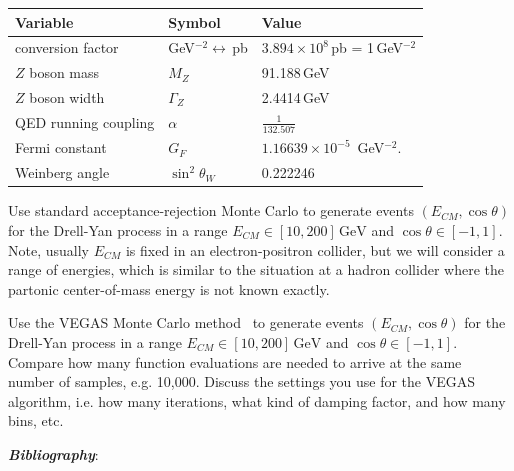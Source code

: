 \begin{center}
  \begin{tabular}{lll}
    Variable             & Symbol                        & Value                                  \\ \hline
    conversion factor    & GeV$^{-2}\leftrightarrow$\,pb & $3.894\times 10^8$\,pb = 1\,GeV$^{-2}$ \\
    $Z$ boson mass       & $M_Z$                         & 91.188\,GeV                            \\
    $Z$ boson width      & $\Gamma_Z$                    & 2.4414\,GeV                            \\
    QED running coupling & $\alpha$                      & $\frac{1}{132.507}$                    \\
    Fermi constant       & $G_F$                         & $1.16639\times 10^{-5}$~GeV$^{-2}$.    \\
    Weinberg angle       & $\sin^2 \theta_W$             & 0.222246                               \\
  \end{tabular}
\end{center}

\begin{problem}
Use standard acceptance-rejection Monte Carlo to generate events $(E_{CM}, \cos\theta)$ for the Drell-Yan process in a range $E_{CM} \in [10, 200]\,\text{GeV}$ and $\cos\theta \in [-1, 1]$.
Note, usually $E_{CM}$ is fixed in an electron-positron collider, but we will consider a range of energies, which is similar to the situation at a hadron collider where the partonic center-of-mass energy is not known exactly.
\end{problem}

\begin{problem}
Use the VEGAS Monte Carlo method~\cite{Lepage:1977sw,Lepage:2020tgj} to generate events $(E_{CM}, \cos\theta)$ for the Drell-Yan process in a range $E_{CM} \in [10, 200]\,\text{GeV}$ and $\cos\theta \in [-1, 1]$.
Compare how many function evaluations are needed to arrive at the same number of samples, e.g. 10,000.
Discuss the settings you use for the VEGAS algorithm, i.e. how many iterations, what kind of damping factor, and how many bins, etc.
\end{problem}

\newpage

\noindent\textbf{\emph{Bibliography}}:\\
\printbibliography[heading=none]


